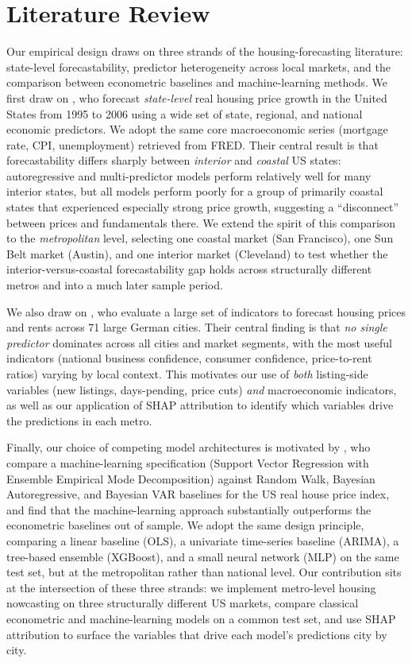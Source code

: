 \section{Literature Review}
\label{sec:lit}

Our empirical design draws on three strands of the housing-forecasting literature: state-level forecastability, predictor heterogeneity across local markets, and the comparison between econometric baselines and machine-learning methods. We first draw on \citet{rapach2009forecasting}, who forecast \textit{state-level} real housing price growth in the United States from 1995 to 2006 using a wide set of state, regional, and national economic predictors. We adopt the same core macroeconomic series (mortgage rate, CPI, unemployment) retrieved from FRED. Their central result is that forecastability differs sharply between \textit{interior} and \textit{coastal} US states: autoregressive and multi-predictor models perform relatively well for many interior states, but all models perform poorly for a group of primarily coastal states that experienced especially strong price growth, suggesting a ``disconnect'' between prices and fundamentals there. We extend the spirit of this comparison to the \textit{metropolitan} level, selecting one coastal market (San Francisco), one Sun Belt market (Austin), and one interior market (Cleveland) to test whether the interior-versus-coastal forecastability gap holds across structurally different metros and into a much later sample period.

We also draw on \citet{kholodilin2014business}, who evaluate a large set of indicators to forecast housing prices and rents across 71 large German cities. Their central finding is that \textit{no single predictor} dominates across all cities and market segments, with the most useful indicators (national business confidence, consumer confidence, price-to-rent ratios) varying by local context. This motivates our use of \textit{both} listing-side variables (new listings, days-pending, price cuts) \textit{and} macroeconomic indicators, as well as our application of SHAP attribution to identify which variables drive the predictions in each metro.

Finally, our choice of competing model architectures is motivated by \citet{plakandaras2015forecasting}, who compare a machine-learning specification (Support Vector Regression with Ensemble Empirical Mode Decomposition) against Random Walk, Bayesian Autoregressive, and Bayesian VAR baselines for the US real house price index, and find that the machine-learning approach substantially outperforms the econometric baselines out of sample. We adopt the same design principle, comparing a linear baseline (OLS), a univariate time-series baseline (ARIMA), a tree-based ensemble (XGBoost), and a small neural network (MLP) on the same test set, but at the metropolitan rather than national level. Our contribution sits at the intersection of these three strands: we implement metro-level housing nowcasting on three structurally different US markets, compare classical econometric and machine-learning models on a common test set, and use SHAP attribution to surface the variables that drive each model's predictions city by city.
